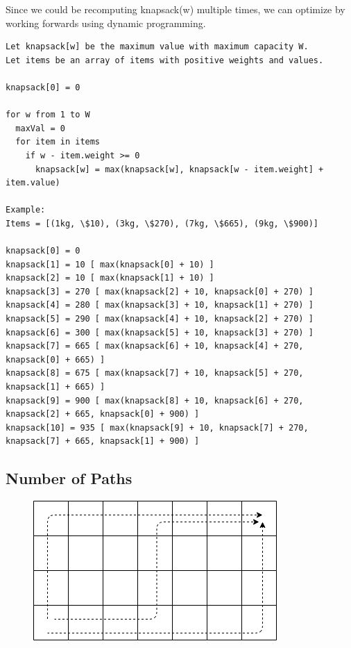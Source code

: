 \documentclass[11pt,oneside]{book}
\makeatletter
\def\maxwidth#1{\ifdim\Gin@nat@width>#1 #1\else\Gin@nat@width\fi}
\makeatother
\begin{document}
Since we could be recomputing knapsack(w) multiple times, we can optimize by working forwards using dynamic programming.

\begin{lstlisting}
Let knapsack[w] be the maximum value with maximum capacity W.
Let items be an array of items with positive weights and values.

knapsack[0] = 0

for w from 1 to W
  maxVal = 0
  for item in items
    if w - item.weight >= 0
      knapsack[w] = max(knapsack[w], knapsack[w - item.weight] + item.value)

Example:
Items = [(1kg, \$10), (3kg, \$270), (7kg, \$665), (9kg, \$900)]

knapsack[0] = 0
knapsack[1] = 10 [ max(knapsack[0] + 10) ]
knapsack[2] = 10 [ max(knapsack[1] + 10) ]
knapsack[3] = 270 [ max(knapsack[2] + 10, knapsack[0] + 270) ]
knapsack[4] = 280 [ max(knapsack[3] + 10, knapsack[1] + 270) ]
knapsack[5] = 290 [ max(knapsack[4] + 10, knapsack[2] + 270) ]
knapsack[6] = 300 [ max(knapsack[5] + 10, knapsack[3] + 270) ]
knapsack[7] = 665 [ max(knapsack[6] + 10, knapsack[4] + 270, knapsack[0] + 665) ]
knapsack[8] = 675 [ max(knapsack[7] + 10, knapsack[5] + 270, knapsack[1] + 665) ]
knapsack[9] = 900 [ max(knapsack[8] + 10, knapsack[6] + 270, knapsack[2] + 665, knapsack[0] + 900) ]
knapsack[10] = 935 [ max(knapsack[9] + 10, knapsack[7] + 270, knapsack[7] + 665, knapsack[1] + 900) ]
\end{lstlisting}

\subsection{Number of Paths}

\vspace{5px}\begin{figure}[H]\centering
        \includegraphics[width=0.66\maxwidth{\textwidth}]{recursion_grid.png}
        \end{figure}
\end{document}
